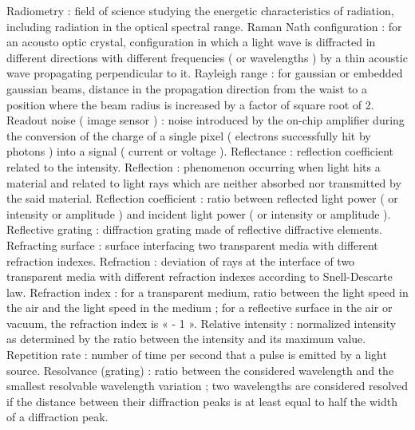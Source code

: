 Radiometry                                           : field of science studying the energetic characteristics of radiation, including radiation in the optical spectral range.
Raman Nath configuration                             : for an acousto optic crystal, configuration in which a light wave is diffracted in different directions with different frequencies ( or wavelengths ) by a thin acoustic wave propagating perpendicular to it.
Rayleigh range                                       : for gaussian or embedded gaussian beams, distance in the propagation direction from the waist to a position where the beam radius is increased by a factor of square root of 2.
Readout noise ( image sensor )                       : noise introduced by the on-chip amplifier during the conversion of the charge of a single pixel ( electrons successfully hit by photons ) into a signal ( current or voltage ).
Reflectance                                          : reflection coefficient related to the intensity.
Reflection                                           : phenomenon occurring when light hits a material and related to light rays which are neither absorbed nor transmitted by the said material.
Reflection coefficient                               : ratio between reflected light power ( or intensity or amplitude ) and incident light power ( or intensity or amplitude ).
Reflective grating                                   : diffraction grating made of reflective diffractive elements.
Refracting surface                                   : surface interfacing two transparent media with different refraction indexes.
Refraction                                           : deviation of rays at the interface of two transparent media with different refraction indexes according to Snell-Descarte law.
Refraction index                                     : for a transparent medium, ratio between the light speed in the air and the light speed in the medium ; for a reflective surface in the air or vacuum, the refraction index is « - 1 ».
Relative intensity                                   : normalized intensity as determined by the ratio between the intensity and its maximum value.
Repetition rate                                      : number of time per second that a pulse is emitted by a light source.
Resolvance (grating)                                 : ratio between the considered wavelength and the smallest resolvable wavelength variation ; two wavelengths are considered resolved if the distance between their diffraction peaks is at least equal to half the width of a diffraction peak.
